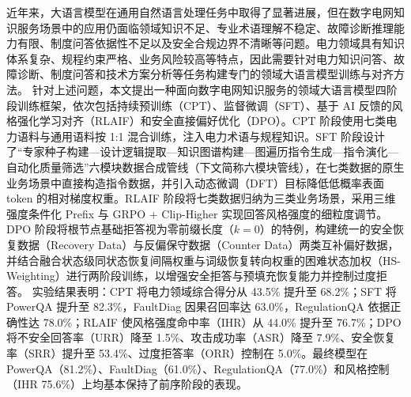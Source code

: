 \documentclass[fontset=fandol,type=master,campus=shenzhen,etitleauto=true]{hithesisbook}
\begin{document}
\frontmatter

\begin{cabstract}
近年来，大语言模型在通用自然语言处理任务中取得了显著进展，但在数字电网知识服务场景中的应用仍面临领域知识不足、专业术语理解不稳定、故障诊断推理能力有限、制度问答依据性不足以及安全合规边界不清晰等问题。电力领域具有知识体系复杂、规程约束严格、业务风险较高等特点，因此需要针对电力知识问答、故障诊断、制度问答和技术方案分析等任务构建专门的领域大语言模型训练与对齐方法。
针对上述问题，本文提出一种面向数字电网知识服务的领域大语言模型四阶段训练框架，依次包括持续预训练（CPT）、监督微调（SFT）、基于 AI 反馈的风格强化学习对齐（RLAIF）和安全直接偏好优化（DPO）。CPT 阶段使用七类电力语料与通用语料按 1:1 混合训练，注入电力术语与规程知识。SFT 阶段设计了“专家种子构建—设计逻辑提取—知识图谱构建—图遍历指令生成—指令演化—自动化质量筛选”六模块数据合成管线（下文简称六模块管线），在七类数据的原生业务场景中直接构造指令数据，并引入动态微调（DFT）目标降低低概率表面 token 的相对梯度权重。RLAIF 阶段将七类数据归纳为三类业务场景，采用三维强度条件化 Prefix 与 GRPO + Clip-Higher 实现回答风格强度的细粒度调节。DPO 阶段将根节点基础拒答视为零前缀长度（$k=0$）的特例，构建统一的安全恢复数据（Recovery Data）与反偏保守数据（Counter Data）两类互补偏好数据，并结合融合状态级同状态恢复间隔权重与词级恢复转向权重的困难状态加权（HS-Weighting）进行两阶段训练，以增强安全拒答与预填充恢复能力并控制过度拒答。
实验结果表明：CPT 将电力领域综合得分从 43.5\% 提升至 68.2\%；SFT 将 PowerQA 提升至 82.3\%，FaultDiag 因果召回率达 63.0\%，RegulationQA 依据正确性达 78.0\%；RLAIF 使风格强度命中率（IHR）从 44.0\% 提升至 76.7\%；DPO 将不安全回答率（URR）降至 1.5\%、攻击成功率（ASR）降至 7.9\%、安全恢复率（SRR）提升至 53.4\%、过度拒答率（ORR）控制在 5.0\%。最终模型在 PowerQA（81.2\%）、FaultDiag（61.0\%）、RegulationQA（77.0\%）和风格控制（IHR 75.6\%）上均基本保持了前序阶段的表现。
\end{cabstract}
\end{document}
